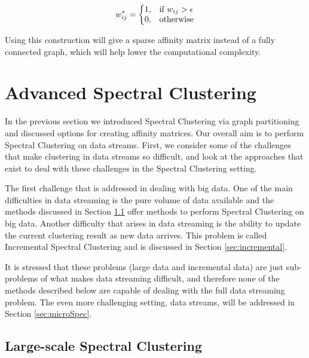 
\begin{equation}
\label{eq:epsilon_graph}
  w^*_{ij}=\left\{
  \begin{array}{@{}ll@{}}
    1, & \text{if}\ w_{ij} > \epsilon \\
    0, & \text{otherwise}
  \end{array}\right.
\end{equation} 

Using this construction will give a sparse affinity matrix instead of a fully connected graph, which will help lower the computational complexity. 

\section{Advanced Spectral Clustering}
\label{sec:ad_spec}

In the previous section we introduced Spectral Clustering via graph partitioning and discussed options for creating affinity matrices. Our overall aim is to perform Spectral Clustering on data streams.   First, we consider some of the challenges that make clustering in data streams so difficult, and look at the approaches that exist to deal with these challenges in the Spectral Clustering setting.

 The first challenge that is addressed in dealing with big data. One of the main difficulties in data streaming is the pure volume of data available and the methods discussed in Section \ref{sec:big_data} offer methods to perform Spectral Clustering on big data.  Another difficulty that arises in data streaming is the ability to update the current clustering result  as new data arrives.  This problem is called Incremental Spectral Clustering and is discussed in Section \ref{sec:incremental}.

It is stressed that these problems (large data and incremental data) are just sub-problems of what makes data streaming difficult, and therefore none of the methods described below are capable of dealing with the full data streaming problem. The even more challenging setting, data streams, will be addressed in Section \ref{sec:microSpec}.    

\subsection{Large-scale Spectral Clustering}
\label{sec:big_data}

